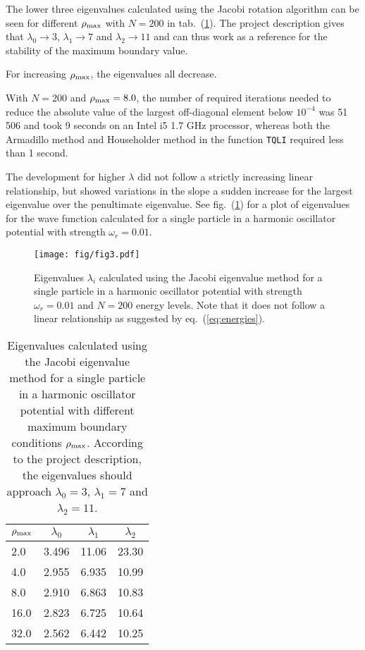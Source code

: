 \documentclass[a4paper,11pt]{article}
\begin{document}
The lower three eigenvalues calculated using the Jacobi rotation algorithm can be seen for different $\rho_{\rm max}$ with $N=200$ in tab.~(\ref{tab:eigvals}). The project description gives that $\lambda_0 \to 3$, $\lambda_1 \to 7$ and $\lambda_2 \to 11$ and can thus work as a reference for the stability of the maximum boundary value.

For increasing $\rho_{\rm max}$, the eigenvalues all decrease.

With $N=200$ and $\rho_{\rm max} = 8.0$, the number of required iterations needed to reduce the absolute value of the largest off-diagonal element below $10^{-4}$ was 51 506 and took 9 seconds on an Intel i5 1.7 GHz processor, whereas both the Armadillo method and Householder method in the function \texttt{TQLI} required less than 1 second.

The development for higher $\lambda$ did not follow a strictly increasing linear relationship, but showed variations in the slope a sudden increase for the largest eigenvalue over the penultimate eigenvalue. See fig.~(\ref{fig:3}) for a plot of eigenvalues for the wave function calculated for a single particle in a harmonic oscillator potential with strength $\omega_r = 0.01$.

\begin{figure}[htb]
    \centering
    \texttt{[image: fig/fig3.pdf]}
    \caption{Eigenvalues $\lambda_i$ calculated using the Jacobi eigenvalue method for a single particle in a harmonic oscillator potential with strength $\omega_r = 0.01$ and $N=200$ energy levels. Note that it does not follow a linear relationship as suggested by eq.~(\ref{eq:energies}).}
    \label{fig:3}
\end{figure}

\begin{table}
    \centering
    \caption{Eigenvalues calculated using the Jacobi eigenvalue method for a single particle in a harmonic oscillator potential with different maximum boundary conditions $\rho_{\rm max}$. According to the project description, the eigenvalues should approach $\lambda_0 = 3$, $\lambda_1 = 7$ and $\lambda_2 = 11$.}
    \begin{tabular}{l c c c}
        $\rho_{\rm max}$    & $\lambda_0$   & $\lambda_1$   & $\lambda_2$ \\
        \hline  
        2.0                 & 3.496         & 11.06         & 23.30 \\
        4.0                 & 2.955         & 6.935         & 10.99 \\
        8.0                 & 2.910         & 6.863         & 10.83 \\
        16.0                & 2.823         & 6.725         & 10.64 \\
        32.0                & 2.562         & 6.442         & 10.25 \\
        \hline
    \end{tabular}
    \label{tab:eigvals}
\end{table}
\end{document}
